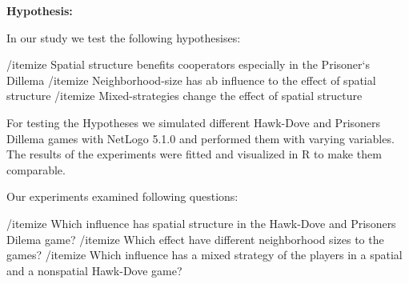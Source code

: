 \textbf{Hypothesis:}

In our study we test the following hypothesises: 

/itemize Spatial structure benefits cooperators especially in the Prisoner`s Dillema 
/itemize Neighborhood-size has ab influence to the effect of spatial structure
/itemize Mixed-strategies change the effect of spatial structure

For testing the Hypotheses we simulated different Hawk-Dove and Prisoners Dillema games with NetLogo 5.1.0 and performed them with varying variables. The results of the experiments were fitted and visualized in R to make them comparable. 

Our experiments examined following questions:

/itemize Which influence has spatial structure in the Hawk-Dove and Prisoners Dilema game?
/itemize Which effect have different neighborhood sizes to the games?
/itemize Which influence has a mixed strategy of the players in a spatial and a nonspatial Hawk-Dove game?

